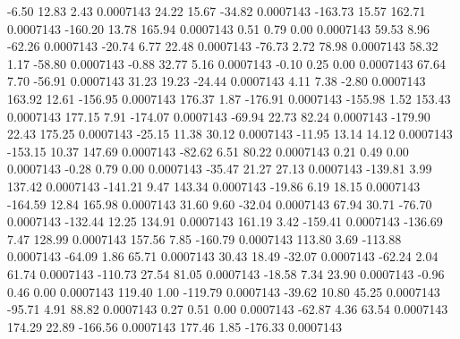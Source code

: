        -6.50       12.83        2.43     0.0007143
       24.22       15.67      -34.82     0.0007143
     -163.73       15.57      162.71     0.0007143
     -160.20       13.78      165.94     0.0007143
        0.51        0.79        0.00     0.0007143
       59.53        8.96      -62.26     0.0007143
      -20.74        6.77       22.48     0.0007143
      -76.73        2.72       78.98     0.0007143
       58.32        1.17      -58.80     0.0007143
       -0.88       32.77        5.16     0.0007143
       -0.10        0.25        0.00     0.0007143
       67.64        7.70      -56.91     0.0007143
       31.23       19.23      -24.44     0.0007143
        4.11        7.38       -2.80     0.0007143
      163.92       12.61     -156.95     0.0007143
      176.37        1.87     -176.91     0.0007143
     -155.98        1.52      153.43     0.0007143
      177.15        7.91     -174.07     0.0007143
      -69.94       22.73       82.24     0.0007143
     -179.90       22.43      175.25     0.0007143
      -25.15       11.38       30.12     0.0007143
      -11.95       13.14       14.12     0.0007143
     -153.15       10.37      147.69     0.0007143
      -82.62        6.51       80.22     0.0007143
        0.21        0.49        0.00     0.0007143
       -0.28        0.79        0.00     0.0007143
      -35.47       21.27       27.13     0.0007143
     -139.81        3.99      137.42     0.0007143
     -141.21        9.47      143.34     0.0007143
      -19.86        6.19       18.15     0.0007143
     -164.59       12.84      165.98     0.0007143
       31.60        9.60      -32.04     0.0007143
       67.94       30.71      -76.70     0.0007143
     -132.44       12.25      134.91     0.0007143
      161.19        3.42     -159.41     0.0007143
     -136.69        7.47      128.99     0.0007143
      157.56        7.85     -160.79     0.0007143
      113.80        3.69     -113.88     0.0007143
      -64.09        1.86       65.71     0.0007143
       30.43       18.49      -32.07     0.0007143
      -62.24        2.04       61.74     0.0007143
     -110.73       27.54       81.05     0.0007143
      -18.58        7.34       23.90     0.0007143
       -0.96        0.46        0.00     0.0007143
      119.40        1.00     -119.79     0.0007143
      -39.62       10.80       45.25     0.0007143
      -95.71        4.91       88.82     0.0007143
        0.27        0.51        0.00     0.0007143
      -62.87        4.36       63.54     0.0007143
      174.29       22.89     -166.56     0.0007143
      177.46        1.85     -176.33     0.0007143
